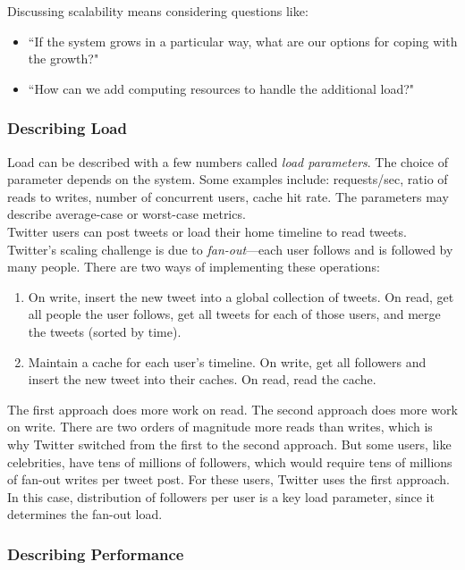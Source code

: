 \documentclass[12pt, titlepage]{article}
\begin{document}
Discussing scalability means considering questions like:
\begin{itemize}
    \item ``If the system grows in a particular way, what are our options for coping with the growth?"
    \item ``How can we add computing resources to handle the additional load?"
\end{itemize}

\subsubsection{Describing Load}

Load can be described with a few numbers called \textit{load parameters}. The choice of parameter depends on the system. Some examples include: requests/sec, ratio of reads to writes, number of concurrent users, cache hit rate. The parameters may describe average-case or worst-case metrics. \\

Twitter users can post tweets or load their home timeline to read tweets. Twitter's scaling challenge is due to \textit{fan-out}---each user follows and is followed by many people. There are two ways of implementing these operations:

\begin{enumerate}
    \item On write, insert the new tweet into a global collection of tweets. On read, get all people the user follows, get all tweets for each of those users, and merge the tweets (sorted by time).
    \item Maintain a cache for each user's timeline. On write, get all followers and insert the new tweet into their caches. On read, read the cache.
\end{enumerate}

The first approach does more work on read. The second approach does more work on write. There are two orders of magnitude more reads than writes, which is why Twitter switched from the first to the second approach. But some users, like celebrities, have tens of millions of followers, which would require tens of millions of fan-out writes per tweet post. For these users, Twitter uses the first approach. \\

In this case, distribution of followers per user is a key load parameter, since it determines the fan-out load.

\subsubsection{Describing Performance}
\end{document}
